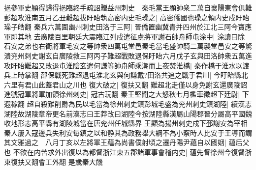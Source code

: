 挹參軍史頴得歸得挹臨終手疏詔贈益州刺史　秦毛當王顯帥衆二萬自襄陽東會俱難彭超攻淮南五月乙丑難超拔盱眙執高密内史毛璪之|{
	高密僑國也璪之領内史戍盱眙璪子皓翻}
秦兵六萬圍幽州刺史田洛于三阿|{
	晉僑置幽冀青并四州於江北三阿今寶應軍即其地}
去廣陵百里朝廷大震臨江列戍遣征虜將軍謝石帥舟師屯涂中|{
	涂讀曰除}
石安之弟也右衛將軍毛安之等帥衆四萬屯堂邑秦毛當毛盛帥騎二萬襲堂邑安之等驚潰兖州刺史謝玄自廣陵救三阿丙子難超戰敗退保盱眙六月戊子玄與田洛帥衆五萬進攻盱眙難超又敗退屯淮陰玄遣何謙等帥舟師乘潮而上夜焚淮橋|{
	秦作橋于淮水以渡兵上時掌翻}
邵保戰死難超退屯淮北玄與何謙戴?田洛共追之戰于君川|{
	今盱眙縣北六里有君山此蓋君山之川也}
復大破之|{
	復扶又翻}
難超北走僅以身免謝玄還廣陵詔進號冠軍將軍加領徐州刺史|{
	冠古玩翻}
秦王堅聞之大怒秋七月檻車徵超下廷尉|{
	下遐稼翻}
超自殺難削爵為民以毛當為徐州刺史鎮彭城毛盛為兖州刺史鎮湖陸|{
	續漢志湖陸故湖陵章帝更名前漢志曰王莽改曰湖陸今按湖陸縣漢屬山陽郡晉分屬高平國魏收地形志高平縣有湖陵城當在唐兖州任城縣界}
王顯為揚州刺史戍下邳謝安為宰相秦人屢入寇邊兵失利安每鎮之以和静其為政務舉大綱不為小察時人比安于王導而謂其文雅過之　八月丁亥以左將軍王藴為尚書僕射頃之遷丹陽尹藴自以國姻|{
	藴后父也}
不欲在内苦求外出復以為都督浙江東五郡諸軍事會稽内史|{
	藴先督徐州今復督浙東復扶又翻會工外翻}
是歲秦大饑

